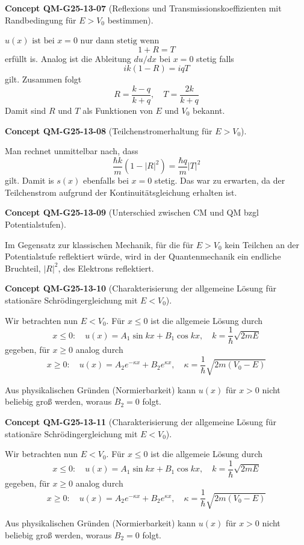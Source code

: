\documentclass[10pt, letterpaper]{article}
\newcommand{\CustomHeading}[3]{%
  \par\medskip\noindent%
  \textbf{#1 #2} \textnormal{(#3)}.\enskip%
}
\newenvironment{CONC}[2]{\CustomHeading{Concept}{#1}{#2}}{}
\begin{document}
\begin{CONC}{QM-G25-13-07}{Reflexions und Transmissionskoeffizienten mit Randbedingung für $E>V_0$ bestimmen}
$u(x) \text { ist bei } x=0 \text { nur dann stetig wenn }$
$$
1+R=T
$$
erfüllt is. Analog ist die Ableitung $d u / d x$ bei $x=0$ stetig falls
$$
i k(1-R)=i q T
$$
gilt. Zusammen folgt
$$
R=\frac{k-q}{k+q}, \quad T=\frac{2 k}{k+q}
$$
Damit sind $R$ und $T$ als Funktionen von $E$ und $V_{0}$ bekannt.
\end{CONC}

\begin{CONC}{QM-G25-13-08}{Teilchenstromerhaltung für $E>V_0$}
Man rechnet unmittelbar nach, dass
$$
\frac{\hbar k}{m}\left(1-|R|^{2}\right)=\frac{\hbar q}{m}|T|^{2}
$$
gilt. Damit is $s(x)$ ebenfalls bei $x=0$ stetig. Das war zu erwarten, da der Teilchenstrom aufgrund der Kontinuitätsgleichung erhalten ist.
\end{CONC}

\begin{CONC}{QM-G25-13-09}{Unterschied zwischen CM und QM bzgl Potentialstufen}
Im Gegensatz zur klassischen Mechanik, für die für $E>V_{0}$ kein Teilchen an der Potentialstufe reflektiert würde, wird in der Quantenmechanik ein endliche Bruchteil, $|R|^{2}$, des Elektrons reflektiert.
\end{CONC}

\begin{CONC}{QM-G25-13-10}{Charakterisierung der allgemeine Lösung für stationäre Schrödingergleichung mit $E<V_0$}
Wir betrachten nun $E<V_{0}$. Für $x \leq 0$ ist die allgemeie Lösung durch
$$
x \leq 0: \quad u(x)=A_{1} \sin k x+B_{1} \cos k x, \quad k=\frac{1}{\hbar} \sqrt{2 m E}
$$
gegeben, für $x \geq 0$ analog durch
$$
x \geq 0: \quad u(x)=A_{2} e^{-\kappa x}+B_{2} e^{\kappa x}, \quad \kappa=\frac{1}{\hbar} \sqrt{2 m\left(V_{0}-E\right)}
$$

Aus physikalischen Gründen (Normierbarkeit) kann $u(x)$ für $x>0$ nicht beliebig groß werden, woraus $B_{2}=0$ folgt.
\end{CONC}

\begin{CONC}{QM-G25-13-11}{Charakterisierung der allgemeine Lösung für stationäre Schrödingergleichung mit $E<V_0$}
Wir betrachten nun $E<V_{0}$. Für $x \leq 0$ ist die allgemeie Lösung durch
$$
x \leq 0: \quad u(x)=A_{1} \sin k x+B_{1} \cos k x, \quad k=\frac{1}{\hbar} \sqrt{2 m E}
$$
gegeben, für $x \geq 0$ analog durch
$$
x \geq 0: \quad u(x)=A_{2} e^{-\kappa x}+B_{2} e^{\kappa x}, \quad \kappa=\frac{1}{\hbar} \sqrt{2 m\left(V_{0}-E\right)}
$$

Aus physikalischen Gründen (Normierbarkeit) kann $u(x)$ für $x>0$ nicht beliebig groß werden, woraus $B_{2}=0$ folgt.
\end{CONC}
\end{document}
